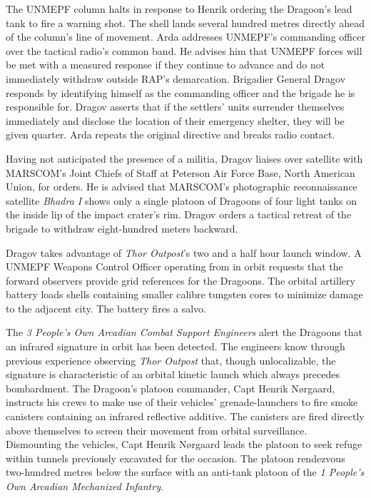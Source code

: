 The UNMEPF column halts in response to Henrik ordering the Dragoon's lead tank to fire a warning shot. The shell lands several hundred metres directly ahead of the column's line of movement. Arda addresses UNMEPF's commanding officer over the tactical radio's common band. He advises him that UNMEPF forces will be met with a measured response if they continue to advance and do not immediately withdraw outside RAP's demarcation. Brigadier General Dragov responds by identifying himself as the commanding officer and the brigade he is responsible for. Dragov asserts that if the settlers' units surrender themselves immediately and disclose the location of their emergency shelter, they will be given quarter. Arda repeats the original directive and breaks radio contact.

Having not anticipated the presence of a militia, Dragov liaises over satellite with MARSCOM's Joint Chiefs of Staff at Peterson Air Force Base, North American Union, for orders. He is advised that MARSCOM's photographic reconnaissance satellite {\it Bhadra I} shows only a single platoon of Dragoons of four light tanks on the inside lip of the impact crater's rim. Dragov orders a tactical retreat of the brigade to withdraw eight-hundred meters backward.
\StopTimelineDate

Dragov takes advantage of {\it Thor Outpost}'s two and a half hour launch window. A UNMEPF Weapons Control Officer operating from in orbit requests that the forward observers provide grid references for the Dragoons. The orbital artillery battery loads shells containing smaller calibre tungsten cores to minimize damage to the adjacent city. The battery fires a salvo.

The {\it 3 People's Own Arcadian Combat Support Engineers} alert the Dragoons that an infrared signature in orbit has been detected. The engineers know through previous experience observing {\it Thor Outpost} that, though unlocalizable, the signature is characteristic of an orbital kinetic launch which always precedes bombardment. The Dragoon's platoon commander, Capt Henrik Nørgaard, instructs his crews to make use of their vehicles' grenade-launchers to fire smoke canisters containing an infrared reflective additive. The canisters are fired directly above themselves to screen their movement from orbital surveillance. Dismounting the vehicles, Capt Henrik Nørgaard leads the platoon to seek refuge within tunnels previously excavated for the occasion. The platoon rendezvous two-hundred metres below the surface with an anti-tank platoon of the {\it 1 People's Own Arcadian Mechanized Infantry}.

